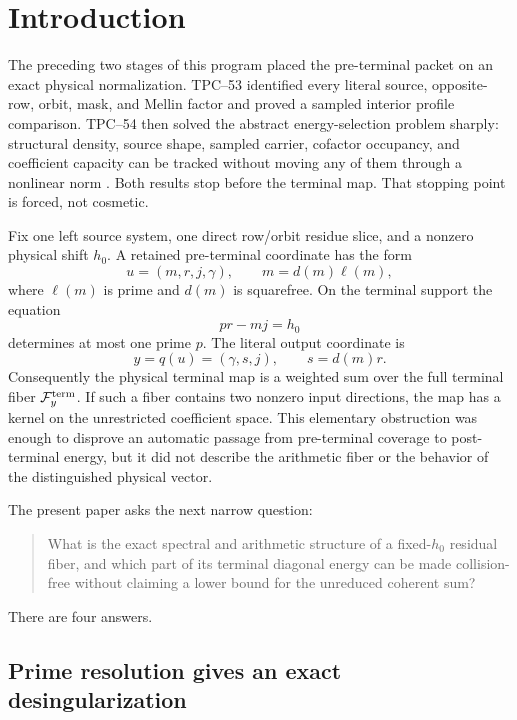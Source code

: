 \section{Introduction}
\label{sec:introduction}

The preceding two stages of this program placed the pre-terminal packet on
an exact physical normalization.  TPC--53 identified every literal source,
opposite-row, orbit, mask, and Mellin factor and proved a sampled interior
profile comparison.  TPC--54 then solved the abstract energy-selection
problem sharply: structural density, source shape, sampled carrier,
cofactor occupancy, and coefficient capacity can be tracked without moving
any of them through a nonlinear norm \citep{WangTPC53,WangTPC54}.  Both
results stop before the terminal map.  That stopping point is forced, not
cosmetic.

Fix one left source system, one direct row/orbit residue slice, and a
nonzero physical shift \(h_0\).  A retained pre-terminal coordinate has the
form
\[
 u=(m,r,j,\gamma),
 \qquad m=d(m)\ell(m),
\]
where \(\ell(m)\) is prime and \(d(m)\) is squarefree.  On the terminal
support the equation
\[
 p r-mj=h_0
\]
determines at most one prime \(p\).  The literal output coordinate is
\[
 y=q(u)=(\gamma,s,j),\qquad s=d(m)r.
\]
Consequently the physical terminal map is a weighted sum over the full
terminal fiber \(\mathcal F_y^{\rm term}\).  If such a fiber contains two
nonzero input directions, the map has a kernel on the unrestricted
coefficient space.  This elementary obstruction was enough to disprove an
automatic passage from pre-terminal coverage to post-terminal energy, but
it did not describe the arithmetic fiber or the behavior of the
distinguished physical vector.

The present paper asks the next narrow question:
\begin{quote}
What is the exact spectral and arithmetic structure of a fixed-\(h_0\)
residual fiber, and which part of its terminal diagonal energy can be made
collision-free without claiming a lower bound for the unreduced coherent
sum?
\end{quote}

There are four answers.

\subsection{Prime resolution gives an exact desingularization}

